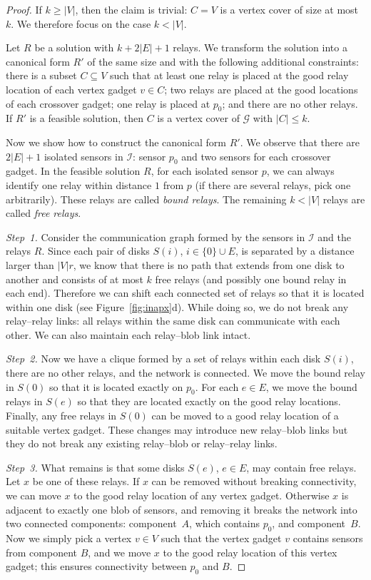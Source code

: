 \documentclass[11pt,a4paper]{article}
\newcommand{\s}[1]{{\lvert #1 \rvert}}
\newcommand{\myG}{\mathcal{G}}
\newcommand{\myI}{\mathcal{I}}
\theoremstyle{definition}
\theoremstyle{remark}
\begin{document}
\begin{proof}
    If $k \ge \s{V}$, then the claim is trivial: $C = V$ is a vertex cover of size at most $k$. We therefore focus on the case $k < \s{V}$.

    Let $R$ be a solution with $k + 2\s{E} + 1$ relays. We transform the solution into a canonical form $R'$ of the same size and with the following additional constraints: there is a subset $C \subseteq V$ such that at least one relay is placed at the good relay location of each vertex gadget $v \in C$; two relays are placed at the good locations of each crossover gadget; one relay is placed at $p_0$; and there are no other relays. If $R'$ is a feasible solution, then $C$ is a vertex cover of $\myG$ with $\s{C} \le k$.

    Now we show how to construct the canonical form $R'$. We observe that there are $2\s{E}+1$ isolated sensors in $\myI$: sensor $p_0$ and two sensors for each crossover gadget. In the feasible solution $R$, for each isolated sensor $p$, we can always identify one relay within distance $1$ from $p$ (if there are several relays, pick one arbitrarily). These relays are called \emph{bound relays}. The remaining $k < \s{V}$ relays are called \emph{free relays}.

    \emph{Step~1.} Consider the communication graph formed by the sensors in $\myI$ and the relays $R$. Since each pair of disks $S(i)$, $i \in \{0\} \cup E$, is separated by a distance larger than $\s{V} r$, we know that there is no path that extends from one disk to another and consists of at most $k$ free relays (and possibly one bound relay in each end). Therefore we can shift each connected set of relays so that it is located within one disk (see Figure~\ref{fig:inapx}d). While doing so, we do not break any relay--relay links: all relays within the same disk can communicate with each other. We can also maintain each relay--blob link intact.

    \emph{Step~2.} Now we have a clique formed by a set of relays within each disk $S(i)$, there are no other relays, and the network is connected. We move the bound relay in $S(0)$ so that it is located exactly on $p_0$. For each $e \in E$, we move the bound relays in $S(e)$ so that they are located exactly on the good relay locations. Finally, any free relays in $S(0)$ can be moved to a good relay location of a suitable vertex gadget. These changes may introduce new relay--blob links but they do not break any existing relay--blob or relay--relay links.

    \emph{Step~3.} What remains is that some disks $S(e)$, $e \in E$, may contain free relays. Let $x$ be one of these relays. If $x$ can be removed without breaking connectivity, we can move $x$ to the good relay location of any vertex gadget. Otherwise $x$ is adjacent to exactly one blob of sensors, and removing it breaks the network into two connected components: component~$A$, which contains $p_0$, and component~$B$. Now we simply pick a vertex $v \in V$ such that the vertex gadget $v$ contains sensors from component $B$, and we move $x$ to the good relay location of this vertex gadget; this ensures connectivity between $p_0$ and $B$.
\end{proof}
\end{document}
